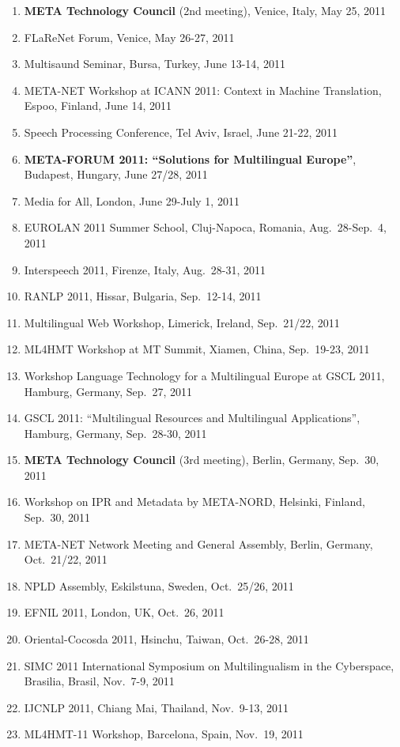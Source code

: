 \documentclass[10pt, plain]{../../metanetpaper}
\begin{document}
\begin{small}
\begin{enumerate}
\item \textbf{META Technology Council} (2nd meeting), Venice, Italy, May 25, 2011
\item FLaReNet Forum, Venice, May 26-27, 2011
\item Multisaund Seminar, Bursa, Turkey, June 13-14, 2011
\item META-NET Workshop at ICANN 2011: Context in Machine Translation,
Espoo, Finland, June 14, 2011
\item Speech Processing Conference, Tel Aviv, Israel, June 21-22, 2011
\item \textbf{META-FORUM 2011: ``Solutions for Multilingual Europe''}, Budapest, Hungary, June 27/28, 2011
\item Media for All, London, June 29-July 1, 2011
\item EUROLAN 2011 Summer School, Cluj-Napoca, Romania, Aug.~28-Sep.~4, 2011
\item Interspeech 2011, Firenze, Italy, Aug.~28-31, 2011
\item RANLP 2011, Hissar, Bulgaria, Sep.~12-14, 2011
\item Multilingual Web Workshop, Limerick, Ireland, Sep.~21/22, 2011
\item ML4HMT Workshop at MT Summit, Xiamen, China, Sep.~19-23, 2011
\item Workshop Language Technology for a Multilingual Europe at GSCL 2011, Hamburg, Germany, Sep.~27, 2011
\item GSCL 2011: ``Multilingual Resources and Multilingual Applications'', Hamburg, Germany, Sep.~28-30, 2011
\item \textbf{META Technology Council} (3rd meeting), Berlin, Germany, Sep.~30, 2011
\item Workshop on IPR and Metadata by META-NORD, Helsinki, Finland, Sep.~30, 2011
\item META-NET Network Meeting and General Assembly, Berlin, Germany, Oct.~21/22, 2011
\item NPLD Assembly, Eskilstuna, Sweden, Oct.~25/26, 2011
\item EFNIL 2011, London, UK, Oct.~26, 2011
\item Oriental-Cocosda 2011, Hsinchu, Taiwan, Oct.~26-28, 2011
\item SIMC 2011 International Symposium on Multilingualism in the Cyberspace, Brasilia, Brasil, Nov.~7-9, 2011
\item IJCNLP 2011, Chiang Mai, Thailand, Nov.~9-13, 2011
\item ML4HMT-11 Workshop, Barcelona, Spain, Nov.~19, 2011

\end{enumerate}
\end{small}
\end{document}
